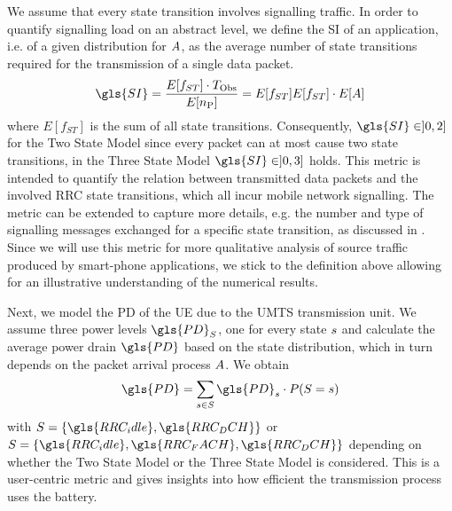 \newcommand{\fStateTransitions}{E[f_{ST}]\xspace}

We assume that every state transition involves signalling traffic.
In order to quantify signalling load on an abstract level, we define the \gls{SI} of an application, i.e. of a given distribution for \(A\), as the average number of state transitions required for the transmission of a single data packet.
\begin{equation}
\gls{SI} = \frac{\fStateTransitions \cdot \ObservationInterval}{E[\NObservedPackets]}\\
= \fStateTransitions {E[f_{ST}] }\cdot E[\PacketIAT]
\label{eq::sigIntensity}
\end{equation}
where \(\fStateTransitions\) is the sum of all state transitions.
Consequently, \(\gls{SI} \in ]0,2]\) for the Two State Model since every packet can at most cause two state transitions, in the Three State Model \(\gls{SI} \in]0,3]\) holds.
This metric is intended to quantify the relation between transmitted data packets and the involved \gls{RRC} state transitions, which all incur mobile network signalling.
The metric can be extended to capture more details, e.g. the number and type of signalling messages exchanged for a specific state transition, as discussed in .
Since we will use this metric for more qualitative analysis of source traffic produced by smart-phone applications, we stick to the definition above allowing for an illustrative understanding of the numerical results.

Next, we model the \gls{PD} of the \gls{UE} due to the \gls{UMTS} transmission unit.
We assume three power levels \(\gls{PD}_{\RRCState}\), one for every state \(s\) and calculate the average power drain \(\gls{PD}\) based on the state distribution, which in turn depends on the packet arrival process \(A\).
We obtain
\begin{equation}
\gls{PD} = \sum_{\RRCStateRealization\in\RRCState} \gls{PD}_{\RRCStateRealization} \cdot P(\RRCState=\RRCStateRealization)
\label{eq::powerdrain}
\end{equation}
with \(\RRCState = \{\gls{RRC_idle},\gls{RRC_DCH}\}\) or \(\RRCState = \{\gls{RRC_idle},\gls{RRC_FACH},\gls{RRC_DCH}\}\) depending on whether the Two State Model or the Three State Model is considered.
This is a user-centric metric and gives insights into how efficient the transmission process uses the battery.
